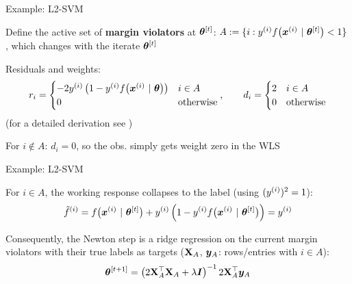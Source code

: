 \documentclass[11pt,compress,t,notes=noshow, xcolor=table]{beamer}
\begin{document}
\begin{framei}[fs=small]{Example: L2-SVM}
\item Define the active set of \textbf{margin violators} at $\bm{\theta}^{[t]}$: $A := \{i : y^{(i)} f\big(\bm{x}^{(i)} ~|~ \bm{\theta}^{[t]}\big) < 1\}$, which changes with the iterate $\bm{\theta}^{[t]}$
\item Residuals and weights:
$$
r_i = \begin{cases} -2 y^{(i)} \left(1 - y^{(i)} f\big(\bm{x}^{(i)} ~|~ \bm{\theta}\big)\right) & i \in A \\ 0 & \text{otherwise} \end{cases}, \qquad
d_i = \begin{cases} 2 & i \in A \\ 0 & \text{otherwise} \end{cases}
$$
(for a detailed derivation see )
\item For $i \notin A$: $d_i = 0$, so the obs. simply gets weight zero in the WLS
\end{framei}


\begin{framei}[fs=small]{Example: L2-SVM}
\item For $i \in A$, the working response collapses to the label (using $(y^{(i)})^2 = 1$):
$$
\tilde{f}^{(i)} = f\big(\bm{x}^{(i)} ~|~ \bm{\theta}^{[t]}\big) + y^{(i)} \left(1 - y^{(i)} f\big(\bm{x}^{(i)} ~|~ \bm{\theta}^{[t]}\big)\right) = y^{(i)}
$$
\item Consequently, the Newton step is a ridge regression on the current margin violators with their true labels as targets ($\mathbf{X}_A$, $\bm{y}_A$: rows/entries with $i \in A$):
$$
\bm{\theta}^{[t +1]} = \left(2 \mathbf{X}_A^\top \mathbf{X}_A + \lambda \bm{I}\right)^{-1} 2 \mathbf{X}_A^\top \bm{y}_A
$$
\end{framei}

\endlecture
\end{document}
